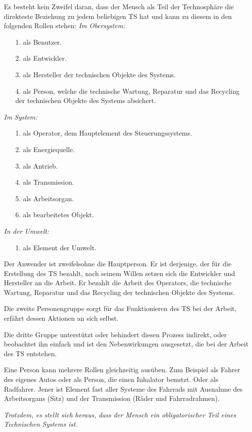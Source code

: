 \documentclass[11pt,a4paper]{article}
\begin{document}
Es besteht kein Zweifel daran, dass der Mensch als Teil der Technosphäre die
direkteste Beziehung zu jedem beliebigen TS hat und kann zu diesem in den
folgenden Rollen stehen:
\emph{Im Obersystem:} 
\begin{itemize}\itemsep0pt
\item[1.] als Benutzer. 
\item[2.] als Entwickler. 
\item[3.] als Hersteller der technischen Objekte des Systems. 
\item[4.] als Person, welche die technische Wartung, Reparatur und das
  Recycling der technischen Objekte des Systems absichert.
\end{itemize}
\emph{Im System:} 
\begin{itemize}\itemsep0pt
\item[1.] als Operator, dem Hauptelement des Steuerungssystems. 
\item[2.] als Energiequelle. 
\item[3.] als Antrieb. 
\item[4.] als Transmission. 
\item[5.] als Arbeitsorgan. 
\item[6.] als bearbeitetes Objekt. 
\end{itemize}
\emph{In der Umwelt:} 
\begin{itemize}\itemsep0pt
\item[1.] als Element der Umwelt. 
\end{itemize}
Der Anwender ist zweifelsohne die Hauptperson. Er ist derjenige, der für die
Erstellung des TS bezahlt, nach seinem Willen setzen sich die Entwickler und
Hersteller an die Arbeit. Er bezahlt die Arbeit des Operators, die technische
Wartung, Reparatur und das Recycling der technischen Objekte des Systems.

Die zweite Personengruppe sorgt für das Funktionieren des TS bei der Arbeit,
erfährt dessen Aktionen an sich selbst.

Die dritte Gruppe unterstützt oder behindert diesen Prozess indirekt, oder
beobachtet ihn einfach und ist den Nebenwirkungen ausgesetzt, die bei der
Arbeit des TS entstehen.

Eine Person kann mehrere Rollen gleichzeitig ausüben. Zum Beispiel als Fahrer
des eigenes Autos oder als Person, die einen Inhalator benutzt. Oder als
Radfahrer.  Jener ist Element fast aller Systeme des Fahrrads mit Ausnahme des
Arbeitsorgans (Sitz) und der Transmission (Räder und Fahrradrahmen).

\emph{Trotzdem, es stellt sich heraus, dass der Mensch ein obligatorischer
  Teil eines Technischen Systems ist.}
\end{document}
